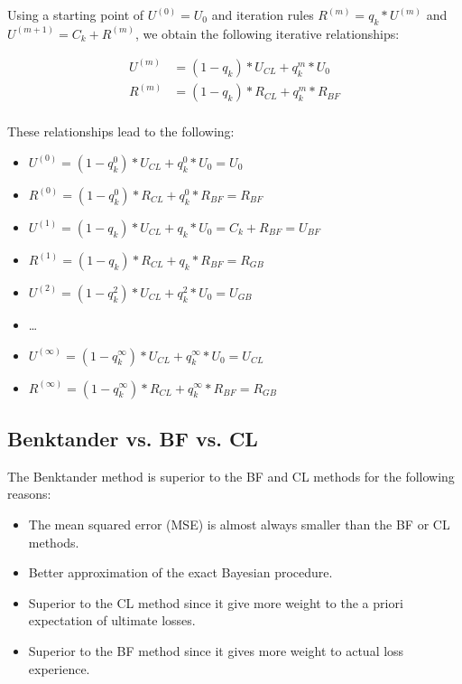 \documentclass{article}
\begin{document}
Using a starting point of $U^{(0)} = U_0$ and iteration rules $R^{(m)} = q_k *
U^{(m)}$ and $U^{(m+1)} = C_k + R^{(m)}$, we obtain the following iterative
relationships:

\begin{equation}
  \begin{aligned}
    U^{(m)} &= (1 - q_k) * U_{CL} + q_k^m * U_0 \\
    R^{(m)} &= (1 - q_k) * R_{CL} + q_k^m * R_{BF} \\
  \end{aligned}
\end{equation}

These relationships lead to the following:

\begin{itemize}
  \item $U^{(0)} = (1 - q_k^0) * U_{CL} + q_k^0 * U_0 = U_{0}$
  \item $R^{(0)} = (1 - q_k^0) * R_{CL} + q_k^0 * R_{BF} = R_{BF}$
  \item $U^{(1)} = (1 - q_k) * U_{CL} + q_k * U_0 = C_k + R_{BF} = U_{BF}$
  \item $R^{(1)} = (1 - q_k) * R_{CL} + q_k * R_{BF} = R_{GB}$
  \item $U^{(2)} = (1 - q_k^2) * U_{CL} + q_k^2 * U_0 = U_{GB}$
  \item \ldots
  \item $U^{(\infty)} = (1 - q_k^\infty) * U_{CL} + q_k^\infty * U_0 = U_{CL}$
  \item $R^{(\infty)} = (1 - q_k^\infty) * R_{CL} + q_k^\infty *
    R_{BF} = R_{GB}$
\end{itemize}

\subsection{Benktander vs. BF vs. CL }
The Benktander method is superior to the BF and CL methods for the following
reasons:

\begin{itemize}
  \item The mean squared error (MSE) is almost always smaller than the BF or
    CL methods.
  \item Better approximation of the exact Bayesian procedure.
  \item Superior to the CL method since it give more weight to the a priori
    expectation of ultimate losses.
  \item Superior to the BF method since it gives more weight to actual loss
    experience.
\end{itemize}
\end{document}
